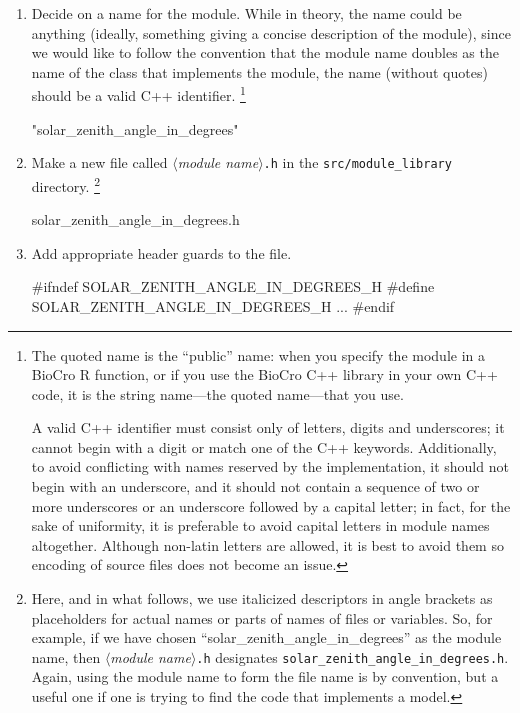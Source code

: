 \documentclass{article}\usepackage[]{graphicx}\usepackage[]{color}
\newcommand{\code}[1]{\lstinline[style=C++style]{#1}}
\newcommand{\placeholder}[1]{$\langle$\textrm{\textit{#1}}$\rangle$}
\begin{document}
\begin{enumerate}

\item Decide on a name for the module.  While in theory, the name
  could be anything (ideally, something giving a concise description
  of the module), since we would like to follow the convention that
  the module name doubles as the name of the class that implements the
  module, the name (without quotes) should be a valid C++ identifier.%
  \footnote{
    The quoted name is the ``public'' name: when you specify
    the module in a BioCro R function, or if you use the BioCro C++
    library in your own C++ code, it is the string name---the quoted
    name---that you use.

    A valid C++ identifier must consist only of letters, digits and
    underscores; it cannot begin with a digit or match one of the C++
    keywords.  Additionally, to avoid conflicting with names reserved
    by the implementation, it should not begin with an underscore, and
    it should not contain a sequence of two or more underscores or an
    underscore followed by a capital letter; in fact, for the sake of
    uniformity, it is preferable to avoid capital letters in module
    names altogether.  Although non-latin letters are allowed, it is
    best to avoid them so encoding of source files does not become an
    issue.}

  \begin{example}[4]
    "solar_zenith_angle_in_degrees"
  \end{example}

\item Make a new file called \placeholder{module name}\code{.h} in the
  \code{src/module_library} directory.%
  \footnote{Here, and in what follows, we use italicized descriptors
    in angle brackets as placeholders for actual names or parts of
    names of files or variables.  So, for example, if we have chosen
    ``solar\_zenith\_angle\_in\_degrees'' as the module name, then
    \placeholder{module name}\code{.h} designates
    \code{solar_zenith_angle_in_degrees.h}.  Again, using the module
    name to form the file name is by convention, but a useful one if
    one is trying to find the code that implements a model.}

  \begin{example}[4]
    solar_zenith_angle_in_degrees.h
  \end{example}

\item Add appropriate header guards to the file.
  \begin{example}[4]
    #ifndef SOLAR_ZENITH_ANGLE_IN_DEGREES_H
    #define SOLAR_ZENITH_ANGLE_IN_DEGREES_H
    ...
    #endif
  \end{example}


\end{enumerate}
\end{document}
